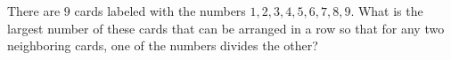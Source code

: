 There are $9$ cards labeled with the numbers $1, 2, 3, 4, 5, 6, 7, 8, 9$. What is the largest number of these cards that can be arranged in a row so that for any two neighboring cards, one of the numbers divides the other?
